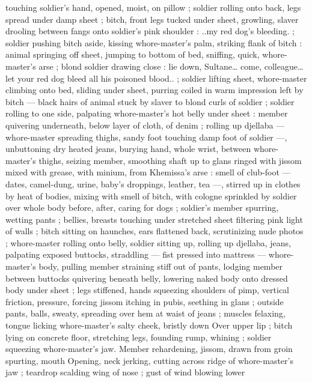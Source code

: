 touching soldier's hand, opened, moist, on pillow ; soldier rolling 
onto back, legs spread under damp sheet ; bitch, front legs tucked 
under sheet, growling, slaver drooling between fangs onto soldier's 
pink shoulder : {\td} {\gl}..my red dog's bleeding.{\gr} ; soldier pushing bitch 
aside, kissing whore-master's palm, striking flank of bitch : animal 
springing off sheet, jumping to bottom of bed, sniffing, quick, 
whore-master's arse ; blond soldier drawing close : {\td} {\gl} {\td} lie down, 
Sultane{\ldots} come, colleague{\ldots} let your red dog bleed all his poisoned 
blood..{\gr} ; soldier lifting sheet, whore-master climbing onto bed, 
sliding under sheet, purring coiled in warm impression left by bitch 
--- black hairs of animal stuck by slaver to blond curls of soldier ; 
soldier rolling to one side, palpating whore-master's hot belly under 
sheet : member quivering underneath, below layer of cloth, of denim 
; rolling up djellaba --- whore-master spreading thighs, sandy foot 
touching damp foot of soldier ---, unbuttoning dry heated jeans, 
burying hand, whole wrist, between whore-master's thighs, seizing 
member, smoothing shaft up to glans ringed with jissom mixed with 
grease, with minium, from Khemissa's arse : smell of club-foot --- 
dates, camel-dung, urine, baby's droppings, leather, tea ---, stirred 
up in clothes by heat of bodies, mixing with smell of bitch, with 
cologne sprinkled by soldier over whole body before, after, caring for 
dogs ; soldier's member spurring, wetting pants ; bellies, breasts 
touching under stretched sheet filtering pink light of walls ; bitch 
sitting on haunches, ears flattened back, scrutinizing nude photos ; 
whore-master rolling onto belly, soldier sitting up, rolling up djellaba, 
jeans, palpating exposed buttocks, straddling --- fist pressed into 
mattress --- whore-master's body, pulling member straining stiff out 
of pants, lodging member between buttocks quivering beneath belly, 
lowering naked body onto dressed body under sheet ; legs stiffened, 
hands squeezing shoulders of pimp, vertical friction, pressure, 
forcing jissom itching in pubis, seething in glans ; outside pants, 
balls, sweaty, spreading over hem at waist of jeans ; muscles 
felaxing, tongue licking whore-master's salty cheek, bristly down 
Over upper lip ; bitch lying on concrete floor, stretching legs, 
founding rump, whining ; soldier squeezing whore-master's jaw. 
Member rehardening, jissom, drawn from groin spurting, mouth 
Opening, neck jerking, cutting across ridge of whore-master's jaw ; 
teardrop scalding wing of nose ; gust of wind blowing lower 
